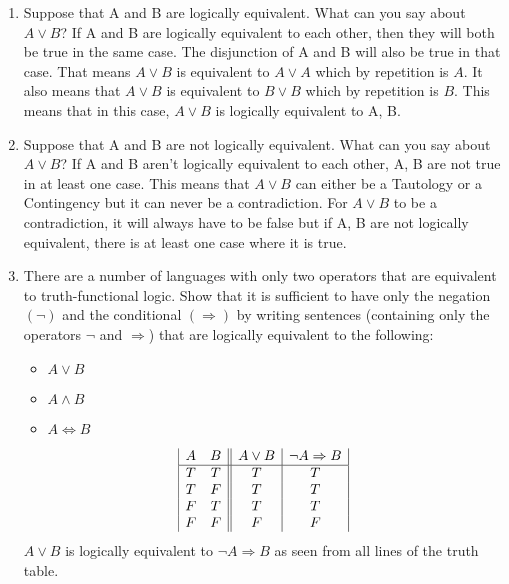\documentclass[]{article}
\begin{document}
\begin{enumerate}
    \item Suppose that A and B are logically equivalent. What can you say about $A \lor B$?
    \newline If A and B are logically equivalent to each other, then they will both be true in the same case. The disjunction of A and B will also be true in that case. That means $A \lor B$ is equivalent to $A \lor A$ which by repetition is $A$. It also means that $A \lor B$ is equivalent to $B \lor B$ which by repetition is $B$. This means that in this case, $A \lor B$ is logically equivalent to A, B.
    
    \item Suppose that A and B are not logically equivalent. What can you say about $A \lor B$?
    \newline If A and B aren't logically equivalent to each other, A, B are not true in at least one case. This means that $A \lor B$ can either be a Tautology or a Contingency but it can never be a contradiction. For $A \lor B$ to be a contradiction, it will always have to be false but if A, B are not logically equivalent, there is at least one case where it is true.
    
    \item There are a number of languages with only two operators that are equivalent to truth-functional logic. Show that it is sufficient to have only the negation $(\neg)$ and the conditional $(\Rightarrow)$ by writing sentences (containing only the operators $\neg$ and $\Rightarrow$) that are logically equivalent to the following:
    
    \begin{itemize}
        \item $A \lor B$
        \item $A \land B$
        \item $A \iff B$
    \end{itemize}
    \begin{displaymath}
    \begin{array}{|c c ||c|c|}
    A & B & A \lor B & \neg A \Rightarrow B\\
    \hline
    T & T & T & T\\
    T & F & T & T\\
    F & T & T & T\\
    F & F & F & F\\
    \end{array}
    \end{displaymath}
    \newline $A \lor B$ is logically equivalent to $\neg A \Rightarrow B$ as seen from all lines of the truth table.
    

\end{enumerate}
\end{document}
